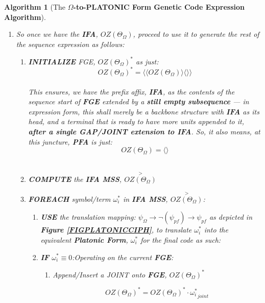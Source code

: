 \documentclass[a4paper, 18pt]{book} %
\newtheorem{alg}{Algorithm}
\begin{document}
\begin{appendices}
\begin{alg}[The \textbf{$\Omega$-to-PLATONIC Form Genetic Code Expression Algorithm}]
\begin{enumerate}
{}
\item{ So once we have the \textbf{IFA}, $OZ(\Theta_\Omega)$, proceed to use it to generate the rest of the sequence expression as follows: 
\begin{enumerate}
\item {\textbf{INITIALIZE} FGE, $\boxed{OZ(\Theta_\Omega)}^*$ as just:\\

\begin{equation}
\label{EQSTARTFGE_ORIG}
\boxed{OZ(\Theta_\Omega)}^* = \langle \langle OZ(\Theta_\Omega) \rangle \langle \rangle \rangle
\end{equation}\\

This ensures, we have the prefix affix, \textbf{IFA}, as the contents of the sequence start of \textbf{FGE} \textit{extended} by a \textbf{still empty subsequence} --- in expression form, this shall merely be a backbone structure with \textbf{IFA} as its head, and a terminal that is ready to have more units appended to it, \textbf{after a single GAP/JOINT extension to IFA}. So, it also means, at this juncture, \textbf{PFA} is just:\\

\begin{equation}
\label{EQSTARTFGESUF_ORIG}
\boxed{OZ(\Theta_\Omega)} = \langle \rangle
\end{equation}\\

}
\item {
	\textbf{COMPUTE} the \textbf{IFA MSS}, $\overset{>}{OZ(\Theta_\Omega)}$
}
\item{\textbf{FOREACH} symbol/term $\omega_i^*$ in \textbf{IFA MSS}, $\overset{>}{OZ(\Theta_\Omega)}$: 
\begin{enumerate}
\item{\textbf{USE} the translation mapping: $\psi_\Omega \rightarrow \lnot(\psi_{pf}) \rightarrow \psi_{pf}$ as depicted in \textbf{Figure \ref{FIGPLATONICCIPH}}, to translate $\omega_i^*$ into the equivalent \textbf{Platonic Form}, $\boxed{\omega_i^*}$ for the final code as such:}
\item { \textbf{IF} $\omega_i^* \equiv 0$:Operating on the current \textbf{FGE}: 
		\begin{enumerate}
		\item { Append/Insert a JOINT onto \textbf{FGE},  $\boxed{OZ(\Theta_\Omega)}^*$

		\begin{equation}
		\label{EQEXTFGEJOINT_ORIG}
		\boxed{OZ(\Theta_\Omega)}^* = \boxed{OZ(\Theta_\Omega)}^* \cdot \boxed{\omega_i^*}_{joint}
		\end{equation}		
		
}
\end{enumerate}}
\end{enumerate}}
\end{enumerate}}
\end{enumerate}
\end{alg}
\end{appendices}
\end{document}
